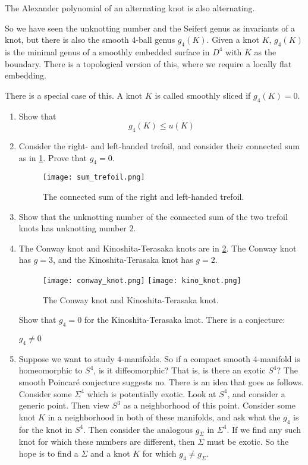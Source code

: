 \documentclass{amsproc}
\begin{document}
\begin{prop}
The Alexander polynomial of an alternating knot is also alternating.
\end{prop}

So we have seen the unknotting number and the Seifert genus as invariants of a knot, but
there is also the smooth $4$-ball genus $g_4\left( K \right)$. 
Given a knot $K$, $g_4\left( K \right)$ is the minimal genus of a smoothly embedded surface in $D^4$
with $K$ as the boundary. 
There is a topological version of this, where we require a locally flat embedding.

There is a special case of this.
A knot $K$ is called smoothly sliced if $g_4\left( K \right) = 0$.

\begin{exr}
\begin{enumerate}
\item
Show that
\begin{equation}
g_4\left( K \right) \leq u\left( K \right)
\end{equation}
\item
Consider the right- and left-handed trefoil, 
and consider their connected sum as in \cref{fig:trefoil_sum}.
Prove that $g_4 = 0$.
\begin{figure}
\texttt{[image: sum\_trefoil.png]}
\caption{The connected sum of the right and left-handed trefoil.}
\label{fig:trefoil_sum}
\end{figure}
\item Show that the unknotting number of the connected sum of the two trefoil 
knots has unknotting number $2$.
\item The Conway knot and Kinoshita-Terasaka knots are in \cref{fig:conway_kino}.
The Conway knot has $g = 3$, and the Kinoshita-Terasaka knot has $g =2$.
\begin{figure}
\centering
\texttt{[image: conway\_knot.png]}
\texttt{[image: kino\_knot.png]}
\caption{The Conway knot and Kinoshita-Terasaka knot.}
\label{fig:conway_kino}
\end{figure}
Show that $g_4 = 0$ for the Kinoshita-Terasaka knot.
There is a conjecture:
\begin{con}
$g_4 \neq 0$
\end{con}

\item Suppose we want to study $4$-manifolds.
So if a compact smooth $4$-manifold is homeomorphic to $S^4$, is it diffeomorphic?
That is, is there an exotic $S^4$? The smooth Poincar\'e conjecture suggests no.
There is an idea that goes as follows. 
Consider some $\Sigma^4$ which is potentially exotic.
Look at $S^4$, and consider a generic point. 
Then view $S^3$ as a neighborhood of this point. 
Consider some knot $K$ in a neighborhood in both of these manifolds, 
and ask what the $g_4$ is for the knot in $S^4$. 
Then consider the analogous $g_\Sigma$ in $\Sigma^4$. 
If we find any such knot for which these numbers are different, then $\Sigma$ must be exotic. 
So the hope is to find a $\Sigma$ and a knot $K$ for which $g_4 \neq g_\Sigma$. 


\end{enumerate}
\end{exr}
\end{document}
